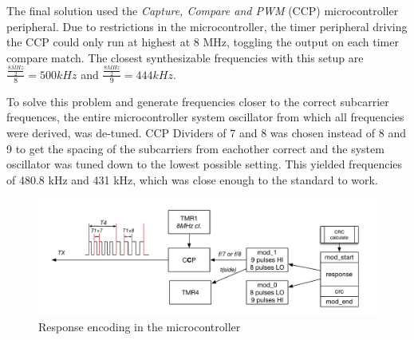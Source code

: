The final solution used the \emph{Capture, Compare and PWM} (CCP) microcontroller peripheral.
Due to restrictions in the microcontroller, the timer peripheral driving the CCP could only run at highest at 8 MHz, toggling the output on each timer compare match.
The closest synthesizable frequencies with this setup are $\frac{\frac{8 MHz}{2}}{8} = 500 kHz$ and $\frac{\frac{8 MHz}{2}}{9} = 444 kHz$.

To solve this problem and generate frequencies closer to the correct subcarrier frequences, the entire microcontroller system oscillator from which all frequencies were derived, was de-tuned.
CCP Dividers of 7 and 8 was chosen instead of 8 and 9 to get the spacing of the subcarriers from eachother correct and the system oscillator was tuned down to the lowest possible setting.
This yielded frequencies of 480.8 kHz and 431 kHz, which was close enough to the standard to work.

\begin{figure}[h!]
    \centering
    \includegraphics[scale=0.5]{res/TX.pdf}
    \caption{Response encoding in the microcontroller}
    \label{fig:tx}
\end{figure}


%
